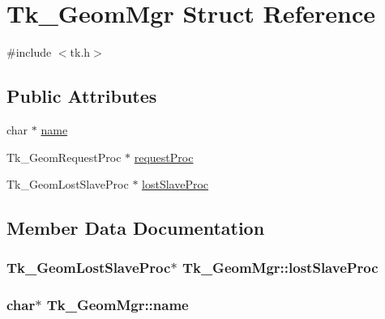 \hypertarget{struct_tk___geom_mgr}{}\section{Tk\+\_\+\+Geom\+Mgr Struct Reference}
\label{struct_tk___geom_mgr}


{\ttfamily \#include $<$tk.\+h$>$}

\subsection*{Public Attributes}
\begin{DoxyCompactItemize}
\item 
char $\ast$ \hyperlink{struct_tk___geom_mgr_aa9a68eac3f48eca0c5b1f5490702a3de}{name}
\item 
Tk\+\_\+\+Geom\+Request\+Proc $\ast$ \hyperlink{struct_tk___geom_mgr_a6121b0d4e6cb73c29c35000edbb15fe6}{request\+Proc}
\item 
Tk\+\_\+\+Geom\+Lost\+Slave\+Proc $\ast$ \hyperlink{struct_tk___geom_mgr_a47fc90a5395219f3132043d536554a4f}{lost\+Slave\+Proc}
\end{DoxyCompactItemize}


\subsection{Member Data Documentation}
\subsubsection[{\texorpdfstring{lost\+Slave\+Proc}{lostSlaveProc}}]{\setlength{\rightskip}{0pt plus 5cm}Tk\+\_\+\+Geom\+Lost\+Slave\+Proc$\ast$ Tk\+\_\+\+Geom\+Mgr\+::lost\+Slave\+Proc}\hypertarget{struct_tk___geom_mgr_a47fc90a5395219f3132043d536554a4f}{}\label{struct_tk___geom_mgr_a47fc90a5395219f3132043d536554a4f}
\subsubsection[{\texorpdfstring{name}{name}}]{\setlength{\rightskip}{0pt plus 5cm}char$\ast$ Tk\+\_\+\+Geom\+Mgr\+::name}\hypertarget{struct_tk___geom_mgr_aa9a68eac3f48eca0c5b1f5490702a3de}{}\label{struct_tk___geom_mgr_aa9a68eac3f48eca0c5b1f5490702a3de}
